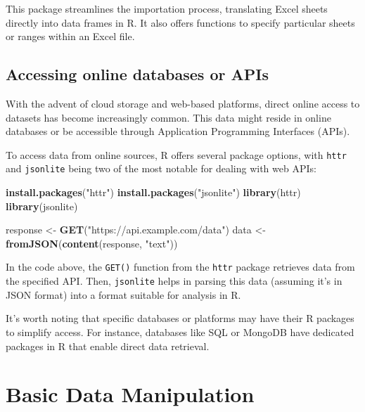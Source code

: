 \documentclass[
  b5paper]{book}
\newenvironment{Shaded}{\begin{snugshade}}{\end{snugshade}}
\newcommand{\FunctionTok}[1]{\textcolor[rgb]{0.13,0.29,0.53}{\textbf{#1}}}
\newcommand{\NormalTok}[1]{#1}
\newcommand{\OtherTok}[1]{\textcolor[rgb]{0.56,0.35,0.01}{#1}}
\newcommand{\StringTok}[1]{\textcolor[rgb]{0.31,0.60,0.02}{#1}}
\begin{document}
This package streamlines the importation process, translating Excel sheets directly into data frames in R. It also offers functions to specify particular sheets or ranges within an Excel file.

\hypertarget{accessing-online-databases-or-apis}{%
\subsection*{Accessing online databases or APIs}\label{accessing-online-databases-or-apis}}

With the advent of cloud storage and web-based platforms, direct online access to datasets has become increasingly common. This data might reside in online databases or be accessible through Application Programming Interfaces (APIs).

To access data from online sources, R offers several package options, with \texttt{httr} and \texttt{jsonlite} being two of the most notable for dealing with web APIs:

\begin{Shaded}
\begin{Highlighting}[]
\FunctionTok{install.packages}\NormalTok{(}\StringTok{"httr"}\NormalTok{)}
\FunctionTok{install.packages}\NormalTok{(}\StringTok{"jsonlite"}\NormalTok{)}
\FunctionTok{library}\NormalTok{(httr)}
\FunctionTok{library}\NormalTok{(jsonlite)}

\NormalTok{response }\OtherTok{\textless{}{-}} \FunctionTok{GET}\NormalTok{(}\StringTok{"https://api.example.com/data"}\NormalTok{)}
\NormalTok{data }\OtherTok{\textless{}{-}} \FunctionTok{fromJSON}\NormalTok{(}\FunctionTok{content}\NormalTok{(response, }\StringTok{"text"}\NormalTok{))}
\end{Highlighting}
\end{Shaded}

In the code above, the \texttt{GET()} function from the \texttt{httr} package retrieves data from the specified API. Then, \texttt{jsonlite} helps in parsing this data (assuming it's in JSON format) into a format suitable for analysis in R.

It's worth noting that specific databases or platforms may have their R packages to simplify access. For instance, databases like SQL or MongoDB have dedicated packages in R that enable direct data retrieval.

\hypertarget{basic-data-manipulation}{%
\section{Basic Data Manipulation}\label{basic-data-manipulation}}
\end{document}
